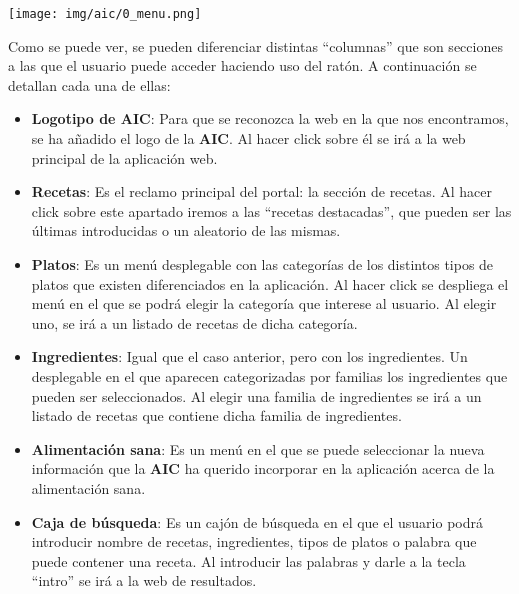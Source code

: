 \documentclass{\ClassPath/viu-tfm-template}
\begin{document}
\begin{center}
    \vspace{-10pt}
    \texttt{[image: img/aic/0\_menu.png]}
    \vspace{-20pt}
\end{center}

Como se puede ver, se pueden diferenciar distintas “columnas” que son secciones a las que el usuario puede acceder haciendo uso del ratón. A continuación se detallan cada una de ellas:

\vspace{-1em}
\begin{itemize}
    \item \textbf{Logotipo de AIC}: Para que se reconozca la web en la que nos encontramos, se ha añadido el logo de la \textbf{AIC}. Al hacer click sobre él se irá a la web principal de la aplicación web.
    \item \textbf{Recetas}: Es el reclamo principal del portal: la sección de recetas. Al hacer click sobre este apartado iremos a las “recetas destacadas”, que pueden ser las últimas introducidas o un aleatorio de las mismas.

    \item \textbf{Platos}: Es un menú desplegable con las categorías de los distintos tipos de platos que existen diferenciados en la aplicación. Al hacer click se despliega el menú en el que se podrá elegir la categoría que interese al usuario. Al elegir uno, se irá a un listado de recetas de dicha categoría.

    \item \textbf{Ingredientes}: Igual que el caso anterior, pero con los ingredientes. Un desplegable en el que aparecen categorizadas por familias los ingredientes que pueden ser seleccionados. Al elegir una familia de ingredientes se irá a un listado de recetas que contiene dicha familia de ingredientes.

    \item \textbf{Alimentación sana}: Es un menú en el que se puede seleccionar la nueva información que la \textbf{AIC} ha querido incorporar en la aplicación acerca de la alimentación sana.

    \item \textbf{Caja de búsqueda}: Es un cajón de búsqueda en el que el usuario podrá introducir nombre de recetas, ingredientes, tipos de platos o palabra que puede contener una receta. Al introducir las palabras y darle a la tecla “intro” se irá a la web de resultados.


\end{itemize}
\end{document}
